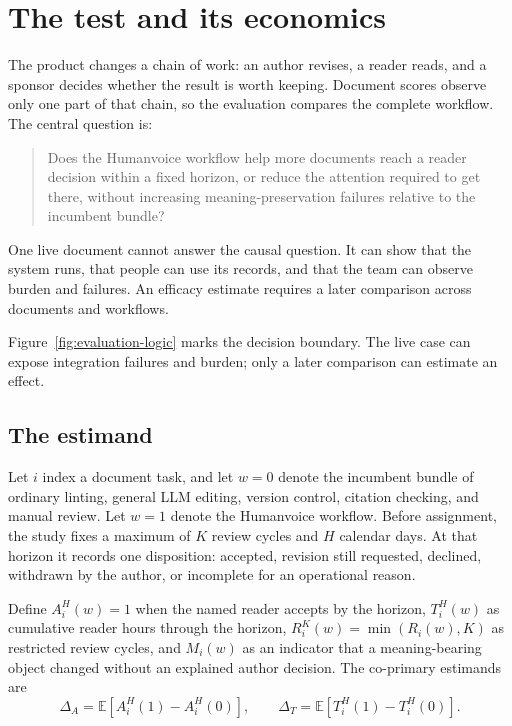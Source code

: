 \chapter{The test and its economics}
\label{ch:evaluation}

The product changes a chain of work: an author revises, a reader reads, and a
sponsor decides whether the result is worth keeping. Document scores observe
only one part of that chain, so the evaluation compares the complete workflow.
The central question is:

\begin{quote}
Does the Humanvoice workflow help more documents reach a reader decision within
a fixed horizon, or reduce the attention required to get there, without
increasing meaning-preservation failures relative to the incumbent bundle?
\end{quote}

One live document cannot answer the causal question. It can show that the
system runs, that people can use its records, and that the team can observe
burden and failures. An efficacy estimate requires a later comparison across
documents and workflows.

Figure~\ref{fig:evaluation-logic} marks the decision boundary. The live case
can expose integration failures and burden; only a later comparison can
estimate an effect.

\hvFigureEvaluationLogic

\section{The estimand}

Let $i$ index a document task, and let $w=0$ denote the incumbent bundle of
ordinary linting, general LLM editing, version control, citation checking, and
manual review. Let $w=1$ denote the Humanvoice workflow. Before assignment, the
study fixes a maximum of $K$ review cycles and $H$ calendar days. At that
horizon it records one disposition: accepted, revision still requested,
declined, withdrawn by the author, or incomplete for an operational reason.

Define $A_i^H(w)=1$ when the named reader accepts by the horizon,
$T_i^H(w)$ as cumulative reader hours through the horizon,
$R_i^K(w)=\min(R_i(w),K)$ as restricted review cycles, and $M_i(w)$ as an
indicator that a meaning-bearing object changed without an explained author
decision. The co-primary estimands are
\begin{equation}
  \Delta_A=\mathbb E[A_i^H(1)-A_i^H(0)],
  \qquad
  \Delta_T=\mathbb E[T_i^H(1)-T_i^H(0)].
  \label{eq:estimand}
\end{equation}

